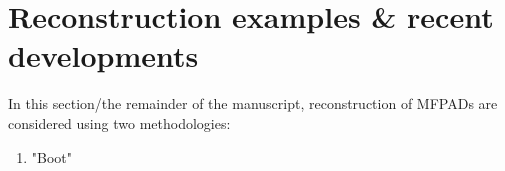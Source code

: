 \section{Reconstruction examples & recent developments}

In this section/the remainder of the manuscript, reconstruction of MFPADs are considered using two methodologies:

\begin{enumerate}
\item "Boot"
\end{enumerate}